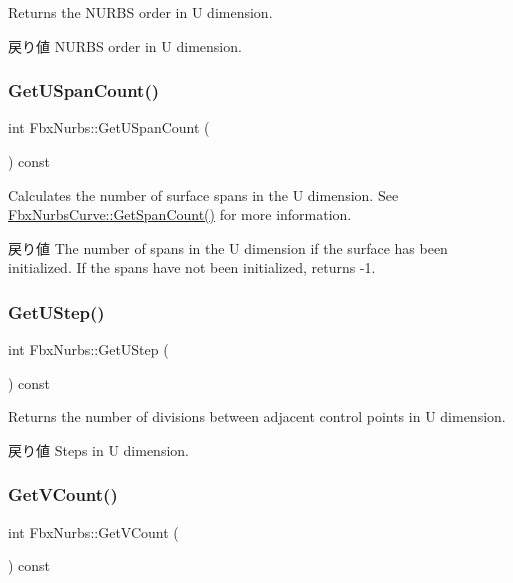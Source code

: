 Returns the N\+U\+R\+BS order in U dimension. \begin{DoxyReturn}{戻り値}
N\+U\+R\+BS order in U dimension. 
\end{DoxyReturn}
\mbox{\label{class_fbx_nurbs_aeac9fe4b1bd0deeb34854a968c852e0e}} 
\subsubsection{\texorpdfstring{Get\+U\+Span\+Count()}{GetUSpanCount()}}
{\footnotesize\ttfamily int Fbx\+Nurbs\+::\+Get\+U\+Span\+Count (\begin{DoxyParamCaption}{ }\end{DoxyParamCaption}) const}

Calculates the number of surface spans in the U dimension. See \hyperlink{class_fbx_nurbs_curve_acb1cf2016f20b2a0c8df382046c7d3ea}{Fbx\+Nurbs\+Curve\+::\+Get\+Span\+Count()} for more information. \begin{DoxyReturn}{戻り値}
The number of spans in the U dimension if the surface has been initialized. If the spans have not been initialized, returns -\/1. 
\end{DoxyReturn}
\mbox{\label{class_fbx_nurbs_a99382e737bd84391f67b00ed6866e1dd}} 
\subsubsection{\texorpdfstring{Get\+U\+Step()}{GetUStep()}}
{\footnotesize\ttfamily int Fbx\+Nurbs\+::\+Get\+U\+Step (\begin{DoxyParamCaption}{ }\end{DoxyParamCaption}) const}

Returns the number of divisions between adjacent control points in U dimension. \begin{DoxyReturn}{戻り値}
Steps in U dimension. 
\end{DoxyReturn}
\mbox{\label{class_fbx_nurbs_a0592be67af1b1e3f663964f932f12df4}} 
\subsubsection{\texorpdfstring{Get\+V\+Count()}{GetVCount()}}
{\footnotesize\ttfamily int Fbx\+Nurbs\+::\+Get\+V\+Count (\begin{DoxyParamCaption}{ }\end{DoxyParamCaption}) const}

